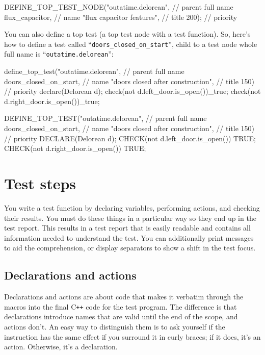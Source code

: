\documentclass[twoside, a4paper, article]{memoir}
\newcommand*\Cpp{C\texttt{++}}
\begin{document}
\begin{cpplisting}
DEFINE_TOP_TEST_NODE("outatime.delorean", // parent full name
                     flux_capacitor, // name
                     "flux capacitor features", // title
                     200); // priority
\end{cpplisting}

You can also define a top test (a top test node with a test function).  So,
here's how to define a test called ``\texttt{doors\_closed\_on\_start}'', child
to a test node whole full name is ``\texttt{outatime.delorean}'':
\begin{cpplisting}
define_top_test("outatime.delorean", // parent full name
                doors_closed_on_start, // name
                "doors closed after construction", // title
                150) { // priority
  declare(Delorean d);
  check(not d.left_door.is_open())_true;
  check(not d.right_door.is_open())_true;
}
\end{cpplisting}

\begin{cpplisting}
DEFINE_TOP_TEST("outatime.delorean", // parent full name
                doors_closed_on_start, // name
                "doors closed after construction", // title
                150) // priority
{
  DECLARE(Delorean d);
  CHECK(not d.left_door.is_open()) TRUE;
  CHECK(not d.right_door.is_open()) TRUE;
}
\end{cpplisting}


\chapter{Test steps}
\label{cha:test-steps}

You write a test function by declaring variables, performing actions, and
checking their results.  You must do these things in a particular way so they
end up in the test report.  This results in a test report that is easily
readable and contains all information needed to understand the test.  You can
additionally print messages to aid the comprehension, or display separators to
show a shift in the test focus.

\section{Declarations and actions}
\label{sec:declarations-actions}

Declarations and actions are about code that makes it verbatim through the
macros into the final \Cpp{} code for the test program.  The difference is that
declarations introduce names that are valid until the end of the scope, and
actions don't.  An easy way to distinguish them is to ask yourself if the
instruction has the same effect if you surround it in curly braces; if it does,
it's an action. Otherwise, it's a declaration.
\end{document}
